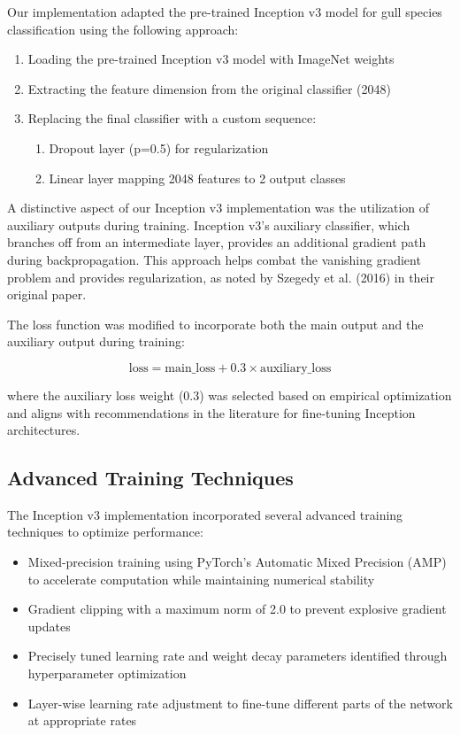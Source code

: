 Our implementation adapted the pre-trained Inception v3 model for gull species classification using the following approach:

\begin{enumerate}
    \item Loading the pre-trained Inception v3 model with ImageNet weights
    \item Extracting the feature dimension from the original classifier (2048)
    \item Replacing the final classifier with a custom sequence:
    \begin{enumerate}
        \item Dropout layer (p=0.5) for regularization
        \item Linear layer mapping 2048 features to 2 output classes
    \end{enumerate}
\end{enumerate}

A distinctive aspect of our Inception v3 implementation was the utilization of auxiliary outputs during training. Inception v3's auxiliary classifier, which branches off from an intermediate layer, provides an additional gradient path during backpropagation. This approach helps combat the vanishing gradient problem and provides regularization, as noted by Szegedy et al. (2016) in their original paper.

The loss function was modified to incorporate both the main output and the auxiliary output during training:

\begin{equation}
\text{loss} = \text{main\_loss} + 0.3 \times \text{auxiliary\_loss}
\end{equation}

where the auxiliary loss weight (0.3) was selected based on empirical optimization and aligns with recommendations in the literature for fine-tuning Inception architectures.

\subsection{Advanced Training Techniques}

The Inception v3 implementation incorporated several advanced training techniques to optimize performance:

\begin{itemize}
    \item Mixed-precision training using PyTorch's Automatic Mixed Precision (AMP) to accelerate computation while maintaining numerical stability
    \item Gradient clipping with a maximum norm of 2.0 to prevent explosive gradient updates
    \item Precisely tuned learning rate and weight decay parameters identified through hyperparameter optimization
    \item Layer-wise learning rate adjustment to fine-tune different parts of the network at appropriate rates
\end{itemize}

